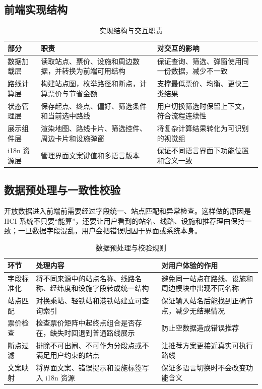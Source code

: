 \documentclass[UTF8,a4paper,11pt]{ctexart}
\begin{document}
\subsection{前端实现结构}

\begin{table}[H]
  \centering
  \caption{实现结构与交互职责}
  \begin{tabularx}{\textwidth}{p{}YY}
    \toprule
    部分 & 职责 & 对交互的影响 \\
    \midrule
    数据加载层 & 读取站点、票价、设施和周边数据，并转换为前端可用结构 & 保证查询、筛选、弹窗使用同一份数据，减少不一致 \\
    路线计算层 & 构建站点图，枚举路径和断点，计算票价与节省金额 & 支撑最低票价、均衡、更快三类结果 \\
    状态管理层 & 保存起点、终点、偏好、筛选条件和当前选中路线 & 用户切换筛选时保留上下文，符合流程连续性 \\
    展示组件层 & 渲染地图、路线卡片、筛选控件、周边卡片和设施弹窗 & 将复杂计算结果转化为可识别的视觉组 \\
    i18n 资源层 & 管理界面文案键值和多语言版本 & 保证不同语言界面下功能位置和含义一致 \\
    \bottomrule
  \end{tabularx}
\end{table}

\subsection{数据预处理与一致性校验}

开放数据进入前端前需要经过字段统一、站点匹配和异常检查。这样做的原因是 HCI 系统不只要“能算”，还要让用户看到的站名、线路、设施和推荐理由保持一致；一旦数据字段混乱，用户会把错误归因于界面或系统本身。

\begin{table}[H]
  \centering
  \caption{数据预处理与校验规则}
  \begin{tabularx}{\textwidth}{p{}YY}
    \toprule
    环节 & 处理内容 & 对用户体验的作用 \\
    \midrule
    字段标准化 & 将不同来源中的站点名称、线路名称、经纬度和设施字段转成统一结构 & 避免同一站点在路线、设施和周边模块中出现不同名称 \\
    站点匹配 & 对换乘站、轻铁站和港铁站建立可查询索引 & 保证输入站名后能找到正确节点，减少无结果情况 \\
    票价检查 & 检查票价矩阵中起终点组合是否存在，缺失时回退到普通路线展示 & 防止空数据造成错误推荐 \\
    断点过滤 & 排除不可出闸、不可作为分段点或不满足用户约束的站点 & 让推荐方案更接近真实可执行路线 \\
    文案映射 & 将界面文案、错误提示和设施标签写入 i18n 资源 & 保证多语言切换时不会改变功能含义 \\
    \bottomrule
  \end{tabularx}
\end{table}
\end{document}
